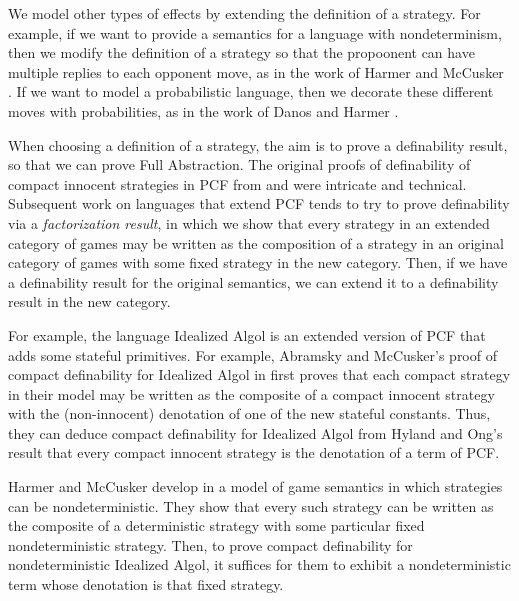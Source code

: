 \documentclass[11pt]{report}
\begin{document}
We model other types of effects by extending the definition of a strategy.  
For example, if we want to provide a semantics for a language with nondeterminism, then we modify the definition of a strategy so that the propoonent can have multiple replies to each opponent move, as in the work of Harmer and McCusker \cite{mcCHFiniteND}.
If we want to model a probabilistic language, then we decorate these different moves with probabilities, as in the work of Danos and Harmer \cite{DanosHarmer}.

When choosing a definition of a strategy, the aim is to prove a definability result, so that we can prove Full Abstraction.  
The original proofs of definability of compact innocent strategies in PCF from \cite{ajmPcf} and \cite{hoPcf} were intricate and technical.  
Subsequent work on languages that extend PCF tends to try to prove definability via a \emph{factorization result}, in which we show that every strategy in an extended category of games may be written as the composition of a strategy in an original category of games with some fixed strategy in the new category.  
Then, if we have a definability result for the original semantics, we can extend it to a definability result in the new category.

For example, the language Idealized Algol is an extended version of PCF that adds some stateful primitives.
For example, Abramsky and McCusker's proof of compact definability for Idealized Algol in \cite{SamsonGuyIAActive} first proves that each compact strategy in their model may be written as the composite of a compact innocent strategy with the (non-innocent) denotation of one of the new stateful constants.  
Thus, they can deduce compact definability for Idealized Algol from Hyland and Ong's result that every compact innocent strategy is the denotation of a term of PCF.  

Harmer and McCusker develop in \cite{mcCHFiniteND} a model of game semantics in which strategies can be nondeterministic.  
They show that every such strategy can be written as the composite of a deterministic strategy with some particular fixed nondeterministic strategy.  
Then, to prove compact definability for nondeterministic Idealized Algol, it suffices for them to exhibit a nondeterministic term whose denotation is that fixed strategy.



\end{document}
